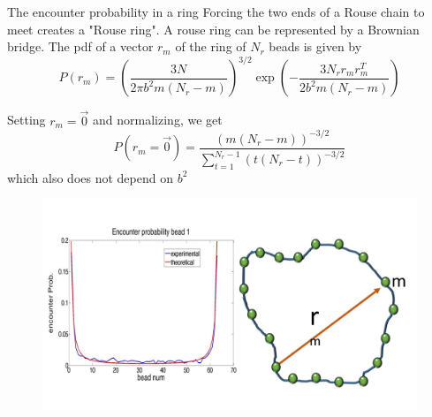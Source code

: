 \documentclass[8pt]{beamer}
\begin{document}
\begin{frame}{The encounter probability in a ring}
Forcing the two ends of a Rouse chain to meet creates a "Rouse ring". 
A rouse ring can be represented by a Brownian bridge.
The pdf of a vector $r_{m}$ of the ring of $N_r$ beads is given by 
\begin{equation*}
P(r_m)=\left(\frac{3N}{2\pi b^2 m(N_r-m)} \right)^{3/2}\exp\left(-\frac{3N_rr_mr_m^T}{2b^2m(N_r-m)}\right)
\end{equation*}

Setting $r_m=\vec{0}$ and normalizing, we get 
\begin{equation*}
P(r_m=\vec{0})=\frac{(m(N_r-m))^{-3/2}}{\sum_{t=1}^{N_r-1}(t(N_r-t))^{-3/2}}
\end{equation*}
which also does not depend on $b^2$ 
\begin{figure}[H]
\includegraphics[scale=0.2]{rouseRingVectorBetween0AndM}
\end{figure}
\end{frame}
\end{document}
